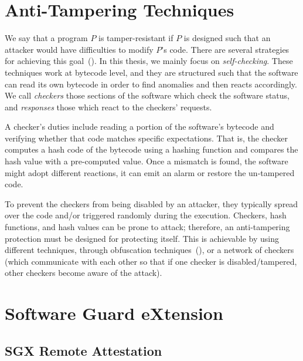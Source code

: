 
\section{Anti-Tampering Techniques}
\label{sec:anti-tampering-techniques}

We say that a program $P$ is tamper-resistant if $P$ is designed such that an 
attacker would have difficulties to modify $P$'s code.
There are several strategies for achieving this 
goal~(\cite{nagra2009surreptitious}).
In this thesis, we mainly focus on \emph{self-checking}.
These techniques work at bytecode level, and they are structured such that the 
software can read its own bytecode in order to find anomalies and then reacts 
accordingly.
We call \emph{checkers} those sections of the software which check the software 
status, and \emph{responses} those which react to the checkers' requests.

A checker's duties include reading a portion of the software's bytecode and 
verifying whether that code matches specific expectations. That is, the checker 
computes a hash code of the bytecode using a hashing function and compares the 
hash value with a pre-computed value. 
Once a mismatch is found, the software might adopt different reactions, \eg it 
can emit an alarm or restore the un-tampered code. 

To prevent the checkers from being disabled by an attacker, they typically 
spread over the code and/or triggered randomly during the execution.
Checkers, hash functions, and hash values can be prone to attack; therefore, an 
anti-tampering protection must be designed for protecting itself.
This is achievable by using different techniques,
\eg through obfuscation techniques~(\cite{banescu2017tutorial}), or a network 
of checkers (which communicate with each other so that if one checker is 
disabled/tampered, other checkers become aware of the attack).

\section{Software Guard eXtension}
\label{sec:software-guard-extension}


\subsection{SGX Remote Attestation}


